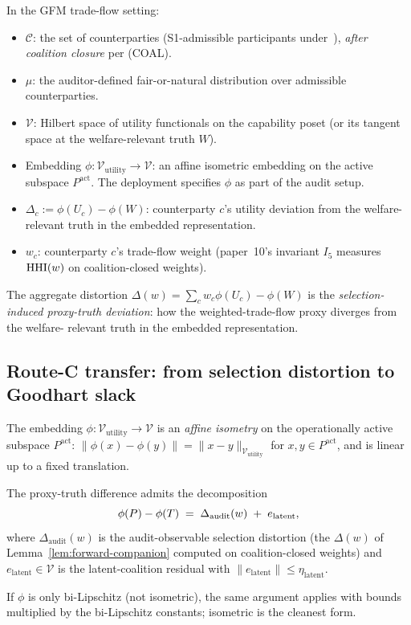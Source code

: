 In the GFM trade-flow setting:
\begin{itemize}
\item $\mathcal{C}$: the set of counterparties (S1-admissible
  participants under~\citep{lasser2026paper8a}), \emph{after
  coalition closure} per (COAL).
\item $\mu$: the auditor-defined fair-or-natural distribution
  over admissible counterparties.
\item $\mathcal{V}$: Hilbert space of utility functionals on the
  capability poset (or its tangent space at the welfare-relevant
  truth $W$).
\item Embedding $\phi: \mathcal{V}_\mathrm{utility} \to
  \mathcal{V}$: an affine isometric embedding on the active
  subspace $P^\mathrm{act}$. The deployment specifies $\phi$ as
  part of the audit setup.
\item $\Delta_c := \phi(U_c) - \phi(W)$: counterparty $c$'s
  utility deviation from the welfare-relevant truth in the
  embedded representation.
\item $w_c$: counterparty $c$'s trade-flow weight
  (paper~10's invariant $I_5$ measures $\mathrm{HHI}(w)$ on
  coalition-closed weights).
\end{itemize}

The aggregate distortion $\Delta(w) = \sum_c w_c \phi(U_c) -
\phi(W)$ is the \emph{selection-induced proxy-truth deviation}:
how the weighted-trade-flow proxy diverges from the welfare-
relevant truth in the embedded representation.

\subsection{Route-C transfer: from selection distortion to Goodhart slack}
\label{sec:concgap-transfer}

\begin{assumption}
\label{ass:embedding-companion}
The embedding $\phi: \mathcal{V}_\mathrm{utility} \to \mathcal{V}$
is an \emph{affine isometry} on the operationally active subspace
$P^\mathrm{act}$: $\|\phi(x) - \phi(y)\| = \|x -
y\|_{\mathcal{V}_\mathrm{utility}}$ for $x, y \in P^\mathrm{act}$,
and is linear up to a fixed translation.

The proxy-truth difference admits the decomposition
\begin{equation}
\label{eq:embedding-decomp-companion}
  \phi(P) - \phi(T) \;=\; \Delta_\mathrm{audit}(w)
  \;+\; e_\mathrm{latent},
\end{equation}
where $\Delta_\mathrm{audit}(w)$ is the audit-observable
selection distortion (the $\Delta(w)$ of
Lemma~\ref{lem:forward-companion} computed on coalition-closed
weights) and $e_\mathrm{latent} \in \mathcal{V}$ is the
latent-coalition residual with $\|e_\mathrm{latent}\| \leq
\eta_\mathrm{latent}$.

If $\phi$ is only bi-Lipschitz (not isometric), the same argument
applies with bounds multiplied by the bi-Lipschitz constants;
isometric is the cleanest form.
\end{assumption}

